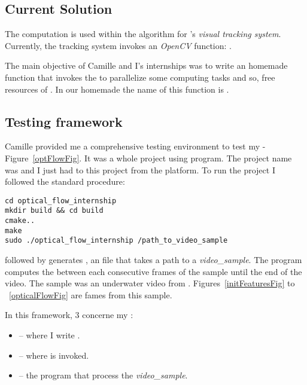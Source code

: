 \subsection{Current Solution}

The \flow{} computation is used within the  algorithm for \iBubble's \emph{visual tracking system}. Currently, the tracking system invokes an \emph{OpenCV} function: .

The main objective of Camille and I's internships was to write an homemade  function that invokes the \vc{} to parallelize some computing tasks and so, free resources of \cpu. In our homemade \api{} the name of this function is .


\subsection{Testing framework}

Camille provided me a comprehensive testing environment to test my \api{} - Figure~\ref{optFlowFig}. It was a whole  project using  program. The project name was  and I just had to  this project from the  platform. To run the project I followed the standard  procedure:


\begin{lstlisting}
cd optical_flow_internship
mkdir build && cd build
cmake..
make
sudo ./optical_flow_internship /path_to_video_sample
\end{lstlisting}


 followed by  generates , an  file that takes a path to a \emph{video\_sample}. The program computes the \flow{} between each consecutive frames of the sample until the end of the video. The sample was an underwater video from \iBubble. Figures~\ref{initFeaturesFig} to ~\ref{opticalFlowFig} are fames from this sample.

In this framework, 3  concerne my \api{}:
\begin{itemize}
	\item {} -- where I write .
	\item {} -- where  is invoked.
	\item {} -- the  program that process the \emph{video\_sample}.
\end{itemize}


